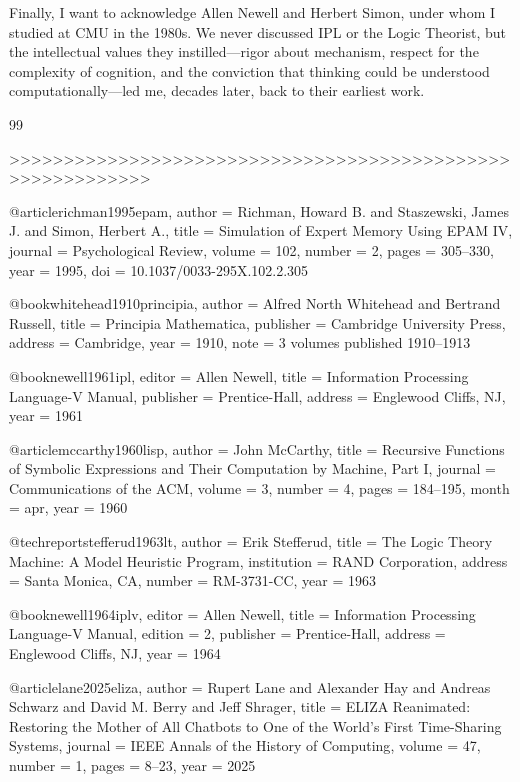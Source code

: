 \documentclass[journal]{IEEEtran}
\begin{document}
Finally, I want to acknowledge Allen Newell and Herbert Simon, under
whom I studied at CMU in the 1980s. We never discussed IPL or the
Logic Theorist, but the intellectual values they instilled---rigor
about mechanism, respect for the complexity of cognition, and the
conviction that thinking could be understood computationally---led me,
decades later, back to their earliest work.

\begin{thebibliography}{99}


>>>>>>>>>>>>>>>>>>>>>>>>>>>>>>>>>>>>>>>>>>>>>>>>>>>>>>>>>>>

@article{richman1995epam,
  author  = {Richman, Howard B. and Staszewski, James J. and Simon, Herbert A.},
  title   = {Simulation of Expert Memory Using {EPAM} {IV}},
  journal = {Psychological Review},
  volume  = {102},
  number  = {2},
  pages   = {305--330},
  year    = {1995},
  doi     = {10.1037/0033-295X.102.2.305}
}

@book{whitehead1910principia,
  author    = {Alfred North Whitehead and Bertrand Russell},
  title     = {Principia Mathematica},
  publisher = {Cambridge University Press},
  address   = {Cambridge},
  year      = {1910},
  note      = {3 volumes published 1910--1913}
}

@book{newell1961ipl,
  editor    = {Allen Newell},
  title     = {Information Processing Language-V Manual},
  publisher = {Prentice-Hall},
  address   = {Englewood Cliffs, NJ},
  year      = {1961}
}

@article{mccarthy1960lisp,
  author  = {John McCarthy},
  title   = {Recursive Functions of Symbolic Expressions and Their Computation by Machine, Part I},
  journal = {Communications of the ACM},
  volume  = {3},
  number  = {4},
  pages   = {184--195},
  month   = apr,
  year    = {1960}
}

@techreport{stefferud1963lt,
  author      = {Erik Stefferud},
  title       = {The Logic Theory Machine: A Model Heuristic Program},
  institution = {RAND Corporation},
  address     = {Santa Monica, CA},
  number      = {RM-3731-CC},
  year        = {1963}
}

@book{newell1964iplv,
  editor    = {Allen Newell},
  title     = {Information Processing Language-V Manual},
  edition   = {2},
  publisher = {Prentice-Hall},
  address   = {Englewood Cliffs, NJ},
  year      = {1964}
}

@article{lane2025eliza,
  author  = {Rupert Lane and Alexander Hay and Andreas Schwarz and David M. Berry and Jeff Shrager},
  title   = {ELIZA Reanimated: Restoring the Mother of All Chatbots to One of the World's First Time-Sharing Systems},
  journal = {IEEE Annals of the History of Computing},
  volume  = {47},
  number  = {1},
  pages   = {8--23},
  year    = {2025}
}


\end{thebibliography}
\end{document}
